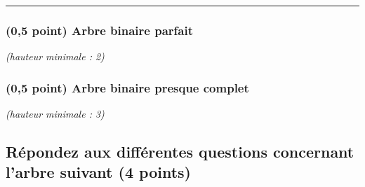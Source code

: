 \documentclass[11pt,a4paper]{article}
\begin{document}
\vspace*{-0.5cm}
\rule{1.0\linewidth}{0.75pt}

\begin{table}[ht!]
  \centering
  \begin{minipage}{0.50\textwidth}
    \centering

\subsubsection{(0,5 point) Arbre binaire parfait}

\textit{(hauteur minimale : 2)}

  \end{minipage}
  \hfillx
  \begin{minipage}{0.50\textwidth}
    \centering

\subsubsection{(0,5 point) Arbre binaire presque complet}

\textit{(hauteur minimale : 3)}

  \end{minipage}
\end{table}



\clearpage


\subsection{Répondez aux différentes questions concernant l'arbre suivant (4 points) }

\bigskip
\end{document}
